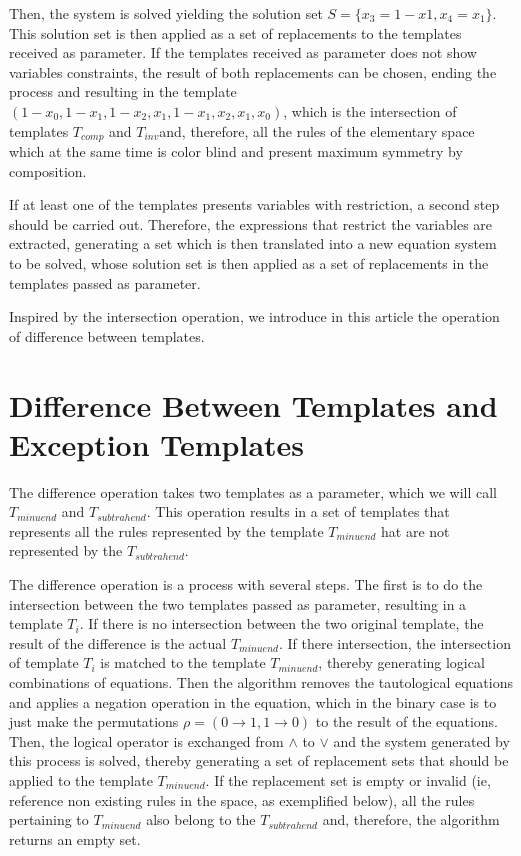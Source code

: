\documentclass[12pt, a4paper]{article}
\begin{document}
Then, the system is solved yielding the solution set $S = \{x_3 = 1-x1, x_4 = x_1\}$. This solution set is then applied as a set of replacements to the templates received as parameter. If the templates received as parameter does not show variables constraints, the result of both replacements can be chosen, ending the process and resulting in the template $(1 - x_0, 1 - x_1, 1 - x_2, x_1, 1 - x_1, x_2, x_1, x_0)$, which is the intersection of templates $T_{comp}$ and $T_{inv}$and, therefore, all the rules of the elementary space which at the same time is color blind and present maximum symmetry by composition.

If at least one of the templates presents variables with restriction, a second step should be carried out. Therefore, the expressions that restrict the variables are extracted, generating a set which is then translated into a new equation system to be solved, whose solution set is then applied as a set of replacements in the templates passed as parameter.

Inspired by the intersection operation, we introduce in this article the operation of difference between templates.

\section{Difference Between Templates and Exception Templates}
\label{sec:diferenca_entre_templates_e_templates_de_excecao}

The difference operation takes two templates as a parameter, which we will call $T_{minuend}$ and $T_{subtrahend}$. This operation results in a set of templates that represents all the rules represented by the template $T_{minuend}$ hat are not represented by the $T_{subtrahend}$.

The difference operation is a process with several steps. The first is to do the intersection between the two templates passed as parameter, resulting in a template $T_i$. If there is no intersection between the two original template, the result of the difference is the actual $T_{minuend}$. If there intersection, the intersection of template $T_i$ is matched to the template $T_{minuend}$, thereby generating logical combinations of equations. Then the algorithm removes the tautological equations and applies a negation operation in the equation, which in the binary case is to just make the permutations $\rho = (0 \to 1, 1 \to 0)$ to the result of the equations. Then, the logical operator is exchanged from $\wedge$ to $\vee$ and the system generated by this process is solved, thereby generating a set of replacement sets that should be applied to the template $T_{minuend}$. If the replacement set is empty or invalid (ie, reference non existing rules in the space, as exemplified below), all the rules pertaining to $T_{minuend}$ also belong to the $T_{subtrahend}$ and, therefore, the algorithm returns an empty set.
\end{document}
